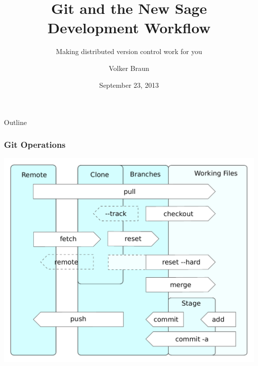 \documentclass[xcolor=pdftex,t,11pt]{beamer}
\author{Volker Braun}
\title{Git and the New Sage Development Workflow}
\subtitle{Making distributed version control work for you}
\institute{Oxford University}
\date{September 23, 2013}
\begin{document}
\begin{frame}[plain]
	\titlepage
\end{frame}

\begin{frame}{Outline}
	\tableofcontents
\end{frame}





\begin{frame}[plain]
  \frametitle{Git Operations}
  \centering
  \includegraphics[width=0.85\linewidth]{images/git_operations}
\end{frame}
\end{document}
